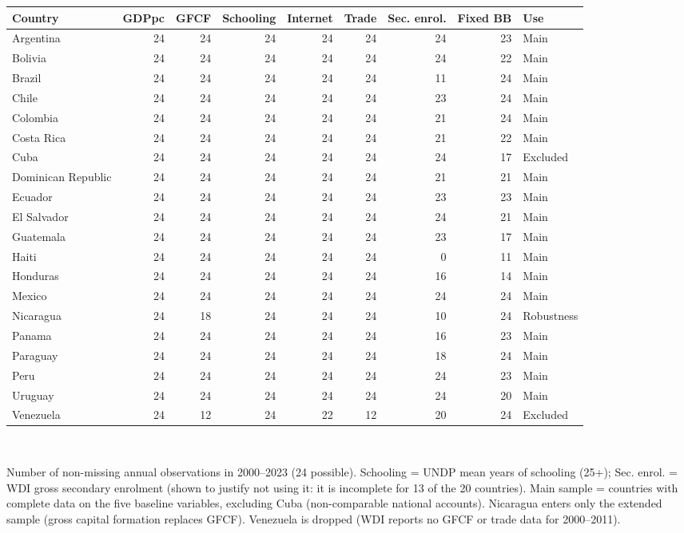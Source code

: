 \begin{tabular}{lrrrrrrrl}\toprule
Country & GDPpc & GFCF & Schooling & Internet & Trade & Sec. enrol. & Fixed BB & Use \\
\midrule
Argentina & 24 & 24 & 24 & 24 & 24 & 24 & 23 & Main \\
Bolivia & 24 & 24 & 24 & 24 & 24 & 24 & 22 & Main \\
Brazil & 24 & 24 & 24 & 24 & 24 & 11 & 24 & Main \\
Chile & 24 & 24 & 24 & 24 & 24 & 23 & 24 & Main \\
Colombia & 24 & 24 & 24 & 24 & 24 & 21 & 24 & Main \\
Costa Rica & 24 & 24 & 24 & 24 & 24 & 21 & 22 & Main \\
Cuba & 24 & 24 & 24 & 24 & 24 & 24 & 17 & Excluded \\
Dominican Republic & 24 & 24 & 24 & 24 & 24 & 21 & 21 & Main \\
Ecuador & 24 & 24 & 24 & 24 & 24 & 23 & 23 & Main \\
El Salvador & 24 & 24 & 24 & 24 & 24 & 24 & 21 & Main \\
Guatemala & 24 & 24 & 24 & 24 & 24 & 23 & 17 & Main \\
Haiti & 24 & 24 & 24 & 24 & 24 & 0 & 11 & Main \\
Honduras & 24 & 24 & 24 & 24 & 24 & 16 & 14 & Main \\
Mexico & 24 & 24 & 24 & 24 & 24 & 24 & 24 & Main \\
Nicaragua & 24 & 18 & 24 & 24 & 24 & 10 & 24 & Robustness \\
Panama & 24 & 24 & 24 & 24 & 24 & 16 & 23 & Main \\
Paraguay & 24 & 24 & 24 & 24 & 24 & 18 & 24 & Main \\
Peru & 24 & 24 & 24 & 24 & 24 & 24 & 23 & Main \\
Uruguay & 24 & 24 & 24 & 24 & 24 & 24 & 20 & Main \\
Venezuela & 24 & 12 & 24 & 22 & 12 & 20 & 24 & Excluded \\
\bottomrule\end{tabular}
\\[3pt]\begin{minipage}{\tablewidth}\footnotesize Number of non-missing annual observations in 2000--2023 (24 possible). Schooling = UNDP mean years of schooling (25+); Sec. enrol. = WDI gross secondary enrolment (shown to justify not using it: it is incomplete for 13 of the 20 countries). Main sample = countries with complete data on the five baseline variables, excluding Cuba (non-comparable national accounts). Nicaragua enters only the extended sample (gross capital formation replaces GFCF). Venezuela is dropped (WDI reports no GFCF or trade data for 2000--2011).\end{minipage}
